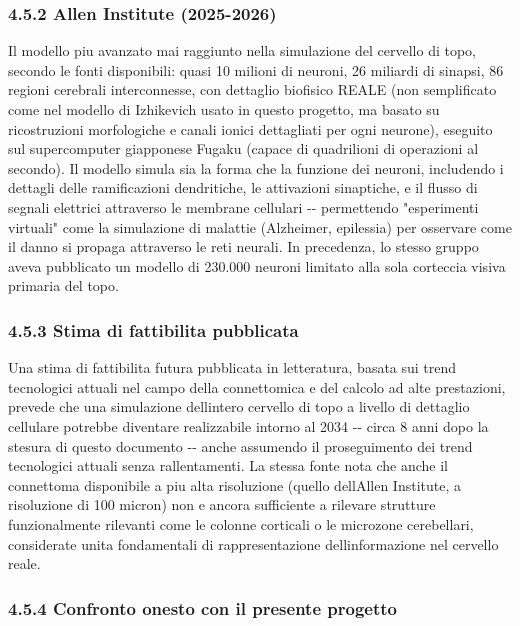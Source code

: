 \documentclass[
  italian,
]{article}
\begin{document}
\subsubsection{4.5.2 Allen Institute (2025-2026)}\label{allen-institute-2025-2026}

Il modello piu\textquotesingle{} avanzato mai raggiunto nella simulazione del cervello di topo, secondo le fonti disponibili: quasi 10 milioni di neuroni, 26 miliardi di sinapsi, 86 regioni cerebrali interconnesse, con dettaglio biofisico REALE (non semplificato come nel modello di Izhikevich usato in questo progetto, ma basato su ricostruzioni morfologiche e canali ionici dettagliati per ogni neurone), eseguito sul supercomputer giapponese Fugaku (capace di quadrilioni di operazioni al secondo). Il modello simula sia la forma che la funzione dei neuroni, includendo i dettagli delle ramificazioni dendritiche, le attivazioni sinaptiche, e il flusso di segnali elettrici attraverso le membrane cellulari -\/- permettendo "esperimenti virtuali" come la simulazione di malattie (Alzheimer, epilessia) per osservare come il danno si propaga attraverso le reti neurali. In precedenza, lo stesso gruppo aveva pubblicato un modello di 230.000 neuroni limitato alla sola corteccia visiva primaria del topo.

\subsubsection{4.5.3 Stima di fattibilita\textquotesingle{} pubblicata}\label{stima-di-fattibilita-pubblicata}

Una stima di fattibilita\textquotesingle{} futura pubblicata in letteratura, basata sui trend tecnologici attuali nel campo della connettomica e del calcolo ad alte prestazioni, prevede che una simulazione dell\textquotesingle intero cervello di topo a livello di dettaglio cellulare potrebbe diventare realizzabile intorno al 2034 -\/- circa 8 anni dopo la stesura di questo documento -\/- anche assumendo il proseguimento dei trend tecnologici attuali senza rallentamenti. La stessa fonte nota che anche il connettoma disponibile a piu\textquotesingle{} alta risoluzione (quello dell\textquotesingle Allen Institute, a risoluzione di 100 micron) non e\textquotesingle{} ancora sufficiente a rilevare strutture funzionalmente rilevanti come le colonne corticali o le microzone cerebellari, considerate unita\textquotesingle{} fondamentali di rappresentazione dell\textquotesingle informazione nel cervello reale.

\subsubsection{4.5.4 Confronto onesto con il presente progetto}\label{confronto-onesto-con-il-presente-progetto}
\end{document}
